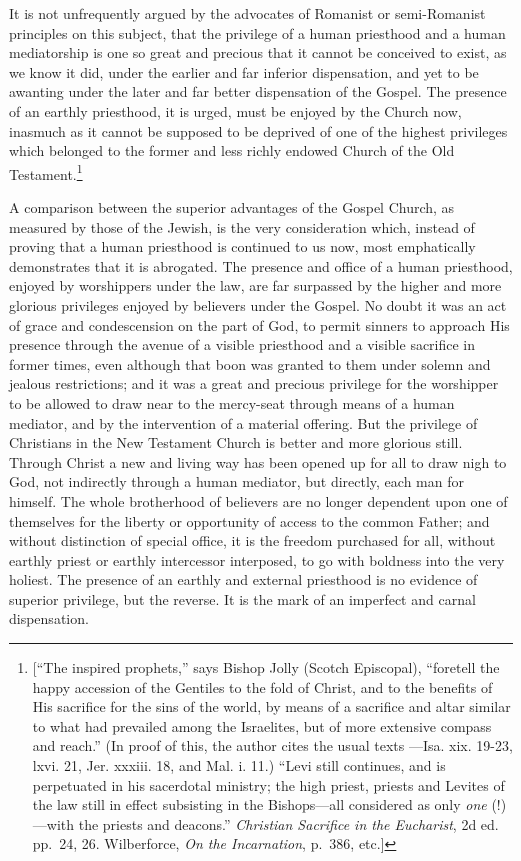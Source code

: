 \documentclass[english,]{book}
\begin{document}
It is not unfrequently argued by the advocates of Romanist or semi-Romanist principles on this subject, that the privilege of a human priesthood and a human mediatorship is one so great and precious that it cannot be conceived to exist, as we know it did, under the earlier and far inferior dispensation, and yet to be awanting under the later and far better dispensation of the Gospel. The presence of an earthly priesthood, it is urged, must be enjoyed by the Church now, inasmuch as it cannot be supposed to be deprived of one of the highest privileges which belonged to the former and less richly endowed Church of the Old Testament.\footnote{{[}``The inspired prophets,'' says Bishop Jolly (Scotch Episcopal), ``foretell the happy accession of the Gentiles to the fold of Christ, and to the benefits of His sacrifice for the sins of the world, by means of a sacrifice and altar similar to what had prevailed among the Israelites, but of more extensive compass and reach.'' (In proof of this, the author cites the usual texts ---Isa. xix. 19-23, lxvi. 21, Jer. xxxiii. 18, and Mal. i. 11.) ``Levi still continues, and is perpetuated in his sacerdotal ministry; the high priest, priests and Levites of the law still in effect subsisting in the Bishops---all considered as only \emph{one} (!)---with the priests and deacons.'' \emph{Christian Sacrifice in the Eucharist}, 2d ed. pp.~24, 26. Wilberforce, \emph{On the Incarnation}, p.~386, etc.{]}}

A comparison between the superior advantages of the Gospel Church, as measured by those of the Jewish, is the very consideration which, instead of proving that a human priesthood is continued to us now, most emphatically demonstrates that it is abrogated. The presence and office of a human priesthood, enjoyed by worshippers under the law, are far surpassed by the higher and more glorious privileges enjoyed by believers under the Gospel. No doubt it was an act of grace and condescension on the part of God, to permit sinners to approach His presence through the avenue of a visible priesthood and a visible sacrifice in former times, even although that boon was granted to them under solemn and jealous restrictions; and it was a great and precious privilege for the worshipper to be allowed to draw near to the mercy-seat through means of a human mediator, and by the intervention of a material offering. But the privilege of Christians in the New Testament Church is better and more glorious still. Through Christ a new and living way has been opened up for all to draw nigh to God, not indirectly through a human mediator, but directly, each man for himself. The whole brotherhood of believers are no longer dependent upon one of themselves for the liberty or opportunity of access to the common Father; and without distinction of special office, it is the freedom purchased for all, without earthly priest or earthly intercessor interposed, to go with boldness into the very holiest. The presence of an earthly and external priesthood is no evidence of superior privilege, but the reverse. It is the mark of an imperfect and carnal dispensation.
\end{document}
